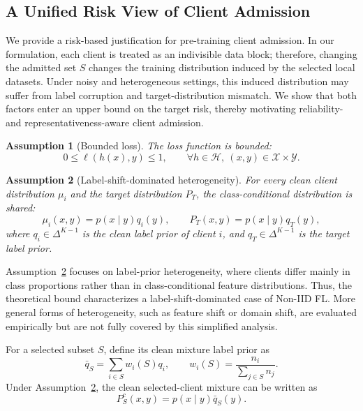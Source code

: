 \documentclass[conference]{IEEEtran}
\newtheorem{assumption}{Assumption}
\theoremstyle{definition}
\theoremstyle{remark}
\begin{document}
\subsection{A Unified Risk View of Client Admission}
\label{subsec:risk_view}

We provide a risk-based justification for pre-training client admission.
In our formulation, each client is treated as an indivisible data block; therefore, changing the admitted set $S$ changes the training distribution induced by the selected local datasets.
Under noisy and heterogeneous settings, this induced distribution may suffer from label corruption and target-distribution mismatch.
We show that both factors enter an upper bound on the target risk, thereby motivating reliability- and representativeness-aware client admission.

\begin{assumption}[Bounded loss]
\label{assump:bounded_loss}
The loss function is bounded:
\begin{equation}
0\le \ell(h(x),y)\le 1,
\qquad
\forall h\in\mathcal{H},\ (x,y)\in\mathcal{X}\times\mathcal{Y}.
\end{equation}
\end{assumption}

\begin{assumption}[Label-shift-dominated heterogeneity]
\label{assump:label_shift}
For every clean client distribution $\mu_i$ and the target distribution $P_T$, the class-conditional distribution is shared:
\begin{equation}
\mu_i(x,y)=p(x\mid y)q_i(y),
\qquad
P_T(x,y)=p(x\mid y)q_T(y),
\end{equation}
where $q_i\in\Delta^{K-1}$ is the clean label prior of client $i$, and $q_T\in\Delta^{K-1}$ is the target label prior.
\end{assumption}

Assumption~\ref{assump:label_shift} focuses on label-prior heterogeneity, where clients differ mainly in class proportions rather than in class-conditional feature distributions.
Thus, the theoretical bound characterizes a label-shift-dominated case of Non-IID FL.
More general forms of heterogeneity, such as feature shift or domain shift, are evaluated empirically but are not fully covered by this simplified analysis.

For a selected subset $S$, define its clean mixture label prior as
\begin{equation}
\bar q_S
=
\sum_{i\in S}w_i(S)q_i,
\qquad
w_i(S)=\frac{n_i}{\sum_{j\in S}n_j}.
\end{equation}
Under Assumption~\ref{assump:label_shift}, the clean selected-client mixture can be written as
\begin{equation}
P_S^c(x,y)=p(x\mid y)\bar q_S(y).
\end{equation}
\end{document}
